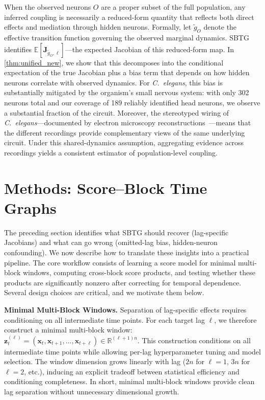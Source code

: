 \documentclass{article}
\theoremstyle{plain}
\theoremstyle{definition}
\theoremstyle{remark}
\newcommand{\R}{\mathbb{R}}
\newcommand{\E}{\mathbb{E}}
\newcommand{\1}{\mathbf{1}}
\newcommand{\x}{\bm{x}}
\newcommand{\z}{\bm{z}}
\newcommand{\J}{\bm{J}}
\begin{document}
When the observed neurons $O$ are a proper subset of the full population, any inferred coupling is necessarily a reduced-form quantity that reflects both direct effects and mediation through hidden neurons. Formally, let $\tilde{g}_O$ denote the effective transition function governing the observed marginal dynamics. SBTG identifies $\E[\J_{\tilde{g}_O, \ell}]$---the expected Jacobian of this reduced-form map. In \cref{thm:unified_new}, we show that this decomposes into the conditional expectation of the true Jacobian plus a bias term that depends on how hidden neurons correlate with observed dynamics. 
For \emph{C.~elegans}, this bias is substantially mitigated by the organism's small nervous system: with only 302 neurons total and our coverage of 189 reliably identified head neurons, we observe a substantial fraction of the circuit. Moreover, the stereotyped wiring of \emph{C.~elegans}---documented by electron microscopy reconstructions~\citep{white1986structure, Cook2019, witvliet2021connectomes}---means that the different recordings provide complementary views of the same underlying circuit. Under this shared-dynamics assumption, aggregating evidence across recordings yields a consistent estimator of population-level coupling.

\section{Methods: Score--Block Time Graphs}
\label{sec:method}

The preceding section identifies what SBTG should recover (lag-specific Jacobians) and what can go wrong (omitted-lag bias, hidden-neuron confounding). We now describe how to translate these insights into a practical pipeline. The core workflow consists of learning a score model for minimal multi-block windows, computing cross-block score products, and testing whether these products are significantly nonzero after correcting for temporal dependence. Several design choices are critical, and we motivate them below.

\textbf{Minimal Multi-Block Windows.} Separation of lag-specific effects requires conditioning on all intermediate time points. For each target lag $\ell$, we therefore construct a minimal multi-block window: $\z^{(\ell)}_t = (\x_t, \x_{t+1}, \ldots, \x_{t+\ell}) \in \R^{(\ell+1)n}.$
This construction conditions on all intermediate time points while allowing per-lag hyperparameter tuning and model selection. The window dimension grows linearly with lag ($2n$ for $\ell = 1$, $3n$ for $\ell = 2$, etc.), inducing an explicit tradeoff between statistical efficiency and conditioning completeness. In short, minimal multi-block windows provide clean lag separation without unnecessary dimensional growth.
\end{document}
